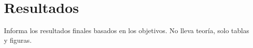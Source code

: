 \chapter{Resultados}

Informa los resultados finales basados en los objetivos. No lleva teoría, solo tablas y figuras.